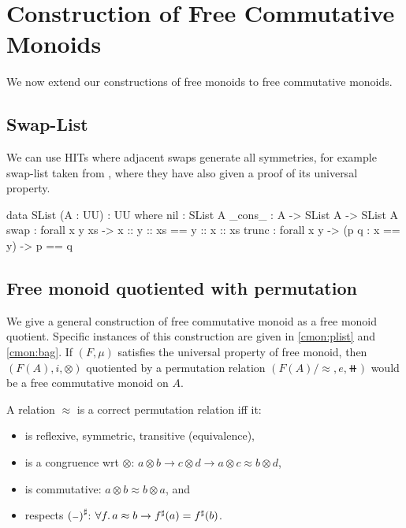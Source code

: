 \section{Construction of Free Commutative Monoids}
\label{sec:commutative-monoids}

We now extend our constructions of free monoids to free commutative monoids.

\subsection{Swap-List}
We can use HITs where adjacent swaps generate all symmetries,
for example swap-list taken from \cite{Choudhury_2023}, where they have
also given a proof of its universal property.

\begin{code}
data SList (A : UU) : UU where
  nil : SList A
  _cons_ : A -> SList A -> SList A
  swap : forall x y xs -> x :: y :: xs == y :: x :: xs 
  trunc : forall x y -> (p q : x == y) -> p == q
\end{code}


\subsection{Free monoid quotiented with permutation}
We give a general construction of free commutative monoid as a free monoid quotient.
Specific instances of this construction are given in \ref{cmon:plist} and \ref{cmon:bag}.
If $(F, \mu)$ satisfies the universal property of free monoid,
then $(F(A), i, \otimes)$ quotiented by a permutation relation $(F(A) / \approx, e, \doubleplus)$
would be a free commutative monoid on $A$.

A relation $\approx$ is a correct permutation relation iff it:
\begin{itemize}
    \item is reflexive, symmetric, transitive (equivalence),
    \item is a congruence wrt $\otimes$: $a \otimes b \to c \otimes d \to a \otimes c \approx b \otimes d$,
    \item is commutative: $a \otimes b \approx b \otimes a$, and
    \item respects ${({\scriptstyle{-}})}^{\sharp}$: $\forall f. \, a \approx b \to {f}^{\sharp}(a) = {f}^{\sharp}(b)$.
\end{itemize}

